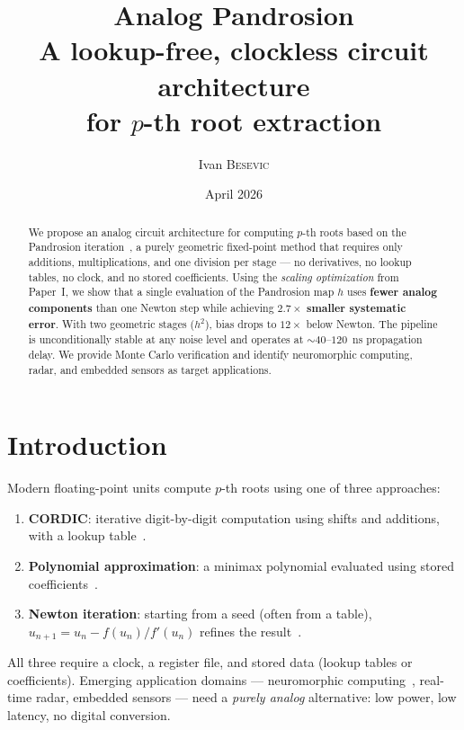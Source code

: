 \documentclass[11pt,a4paper]{article}
\title{\textbf{Analog Pandrosion}\\[0.3em]
  \large A lookup-free, clockless circuit architecture\\
  for $p$-th root extraction}
\author{Ivan \textsc{Besevic}}
\date{April 2026}
\theoremstyle{definition}
\begin{document}
\maketitle

\begin{abstract}
We propose an analog circuit architecture for computing $p$-th roots based on the Pandrosion iteration~\cite{besevic2026}, a purely geometric fixed-point method that requires only additions, multiplications, and one division per stage --- no derivatives, no lookup tables, no clock, and no stored coefficients.  Using the \emph{scaling optimization} from Paper~I, we show that a single evaluation of the Pandrosion map $h$ uses \textbf{fewer analog components} than one Newton step while achieving $2.7\times$ \textbf{smaller systematic error}.  With two geometric stages ($h^2$), bias drops to $12\times$ below Newton.  The pipeline is unconditionally stable at any noise level and operates at $\sim 40$--$120$~ns propagation delay.  We provide Monte Carlo verification and identify neuromorphic computing, radar, and embedded sensors as target applications.
\end{abstract}

\tableofcontents
\bigskip

\section{Introduction}

Modern floating-point units compute $p$-th roots using one of three approaches:
\begin{enumerate}
  \item \textbf{CORDIC}: iterative digit-by-digit computation using shifts and additions, with a lookup table~\cite{volder}.
  \item \textbf{Polynomial approximation}: a minimax polynomial evaluated using stored coefficients~\cite{muller}.
  \item \textbf{Newton iteration}: starting from a seed (often from a table), $u_{n+1} = u_n - f(u_n)/f'(u_n)$ refines the result~\cite{markstein}.
\end{enumerate}

All three require a clock, a register file, and stored data (lookup tables or coefficients).  Emerging application domains --- neuromorphic computing~\cite{neuromorphic}, real-time radar, embedded sensors --- need a \emph{purely analog} alternative: low power, low latency, no digital conversion.
\end{document}
